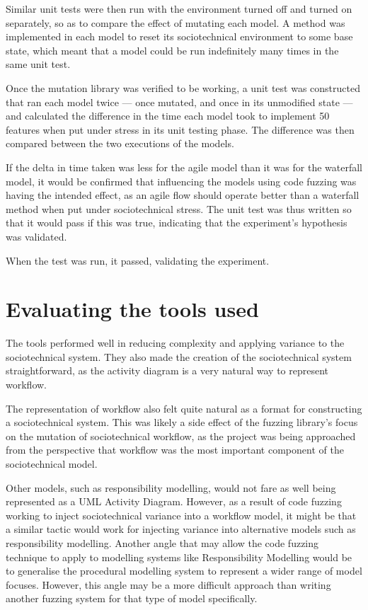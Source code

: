 Similar unit tests were then run with the environment turned off and turned on separately, so as to compare the effect of mutating each model. A method was implemented in each model to reset its sociotechnical environment to some base state, which meant that a model could be run indefinitely many times in the same unit test. \par

Once the mutation library was verified to be working, a unit test was constructed that ran each model twice --- once mutated, and once in its unmodified state --- and calculated the difference in the time each model took to implement 50 features when put under stress in its unit testing phase. The difference was then compared between the two executions of the models. \par

If the delta in time taken was less for the agile model than it was for the waterfall model, it would be confirmed that influencing the models using code fuzzing was having the intended effect, as an agile flow should operate better than a waterfall method when put under sociotechnical stress. The unit test was thus written so that it would pass if this was true, indicating that the experiment's hypothesis was validated. \par

When the test was run, it passed, validating the experiment. \par


\section{Evaluating the tools used}
The tools performed well in reducing complexity and applying variance to the sociotechnical system. They also made the creation of the sociotechnical system straightforward, as the activity diagram is a very natural way to represent workflow. \par

The representation of workflow also felt quite natural as a format for constructing a sociotechnical system. This was likely a side effect of the fuzzing library's focus on the mutation of sociotechnical workflow, as the project was being approached from the perspective that workflow was the most important component of the sociotechnical model. \par

Other models, such as responsibility modelling, would not fare as well being represented as a UML Activity Diagram. However, as a result of code fuzzing working to inject sociotechnical variance into a workflow model, it might be that a similar tactic would work for injecting variance into alternative models such as responsibility modelling. Another angle that may allow the code fuzzing technique to apply to modelling systems like Responsibility Modelling would be to generalise the procedural modelling system to represent a wider range of model focuses. However, this angle may be a more difficult approach than writing another fuzzing system for that type of model specifically. \par

